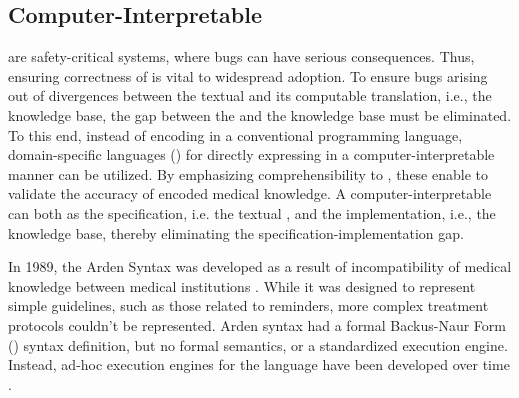 \subsection{Computer-Interpretable \BPGs{}}

\CDSSs{} are safety-critical systems, where bugs can have serious consequences.
Thus, ensuring correctness of \CDSSs{} is vital to widespread adoption.
To ensure bugs arising out of divergences between the textual \BPG{}
and its computable translation, i.e., the knowledge base, the gap between
the \BPG{} and the knowledge base must be eliminated. To this end, instead of
encoding \BPGs{} in a conventional programming language, domain-specific
languages (\DSLs{}) for directly expressing \BPGs{} in a computer-interpretable manner can
be utilized. By emphasizing comprehensibility to \HCPs{}, these \DSLs{} enable
\HCPs{} to validate the accuracy of encoded medical knowledge.
A computer-interpretable \BPGs{} can both as the specification, i.e. the textual \BPG{},
and the implementation, i.e., the knowledge base, thereby eliminating the
specification-implementation gap.

In 1989, the Arden Syntax was developed as a result of incompatibility
of medical knowledge between medical institutions \cite{HripcsakCBM94}.
While it was designed to represent simple guidelines,
such as those related to reminders, more complex treatment protocols couldn't
be represented. Arden syntax had a formal Backus-Naur Form (\BNF{})
syntax definition, but no formal semantics, or a standardized execution engine.
Instead, ad-hoc execution engines for the language have been developed over
time \cite{ClerqAIM03}.












